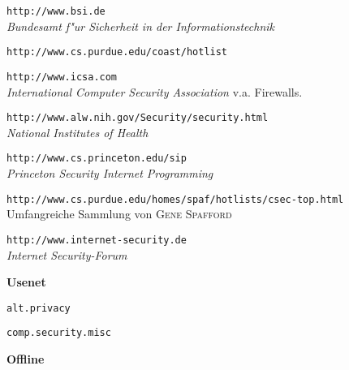 \begin{description}
  

\item \texttt{http://www.bsi.de} \\
  \textit{Bundesamt f"ur Sicherheit in der Informationstechnik}
  
\item \texttt{http://www.cs.purdue.edu/coast/hotlist}
  

\item \texttt{http://www.icsa.com} \\
  \textit{International Computer Security Association} v.a. Firewalls.
  

\item \texttt{http://www.alw.nih.gov/Security/security.html} \\
  \textit{National Institutes of Health}
  

\item \texttt{http://www.cs.princeton.edu/sip} \\
  \textit{Princeton Security Internet Programming}
  

\item \texttt{http://www.cs.purdue.edu/homes/spaf/hotlists/csec-top.html} \\
  Umfangreiche Sammlung von \textsc{Gene Spafford}
  

\item \texttt{http://www.internet-security.de} \\
  \textit{Internet Security-Forum}

\end{description}

\noindent 
\textbf{Usenet}

\begin{description}
  
\item \texttt{alt.privacy}
  
\item \texttt{comp.security.misc}

\end{description}

\noindent 
\textbf{Offline}

